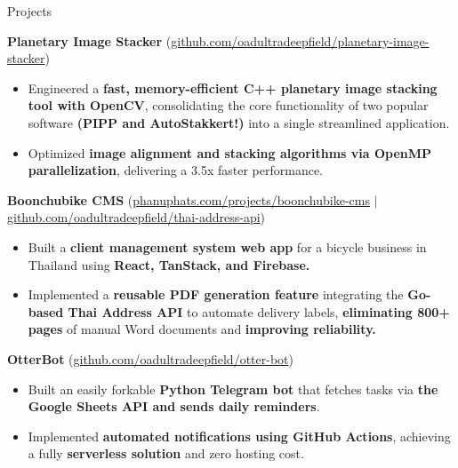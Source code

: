 \documentclass{phanuphat_srisukhawasu_resume} %
\begin{document}

\begin{rSection}{Projects}

  \textbf{Planetary Image Stacker} (\href{https://github.com/oadultradeepfield/planetary-image-stacker}{github.com/oadultradeepfield/planetary-image-stacker})
  \begin{itemize}
    \item Engineered a \textbf{fast, memory-efficient C++ planetary image stacking tool with OpenCV}, consolidating the core functionality of two popular software \textbf{(PIPP and AutoStakkert!)} into a single streamlined application.
    \item Optimized \textbf{image alignment and stacking algorithms via OpenMP parallelization}, delivering a 3.5x faster performance.
  \end{itemize}

  \textbf{Boonchubike CMS} (\href{https://phanuphats.com/projects/boonchubike-cms}{phanuphats.com/projects/boonchubike-cms} $|$ \href{https://github.com/oadultradeepfield/thai-address-api}{github.com/oadultradeepfield/thai-address-api})
  \begin{itemize}
    \item Built a \textbf{client management system web app} for a bicycle business in Thailand using \textbf{React, TanStack, and Firebase.}
    \item Implemented a \textbf{reusable PDF generation feature} integrating the \textbf{Go-based Thai Address API} to automate delivery labels, \textbf{eliminating 800+ pages} of manual Word documents and \textbf{improving reliability.}
  \end{itemize}

  \textbf{OtterBot} (\href{https://github.com/oadultradeepfield/otter-bot}{github.com/oadultradeepfield/otter-bot})
  \begin{itemize}
    \item Built an easily forkable \textbf{Python Telegram bot} that fetches tasks via \textbf{the Google Sheets API and sends daily reminders}.
    \item Implemented \textbf{automated notifications using GitHub Actions}, achieving a fully \textbf{serverless solution} and zero hosting cost.
  \end{itemize}

\end{rSection}
\end{document}
